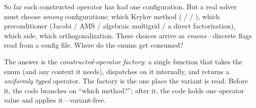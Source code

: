 So far each constructed operator has had one configuration. But a real solver must
choose \emph{among} configurations: which Krylov method ( /  /
), which preconditioner (Jacobi / AMS / algebraic multigrid / a direct
factorization), which side, which orthogonalization. These choices arrive as
\emph{enums}---discrete flags read from a config file. Where do the enums get
consumed?

The answer is the \emph{constructed-operator factory}: a single function that takes
the enum (and any context it needs), dispatches on it internally, and returns a
\emph{uniformly typed} operator. The factory is the one place the variant is read.
Before it, the code branches on ``which method?''; after it, the code holds one
operator value and applies it---variant-free.

